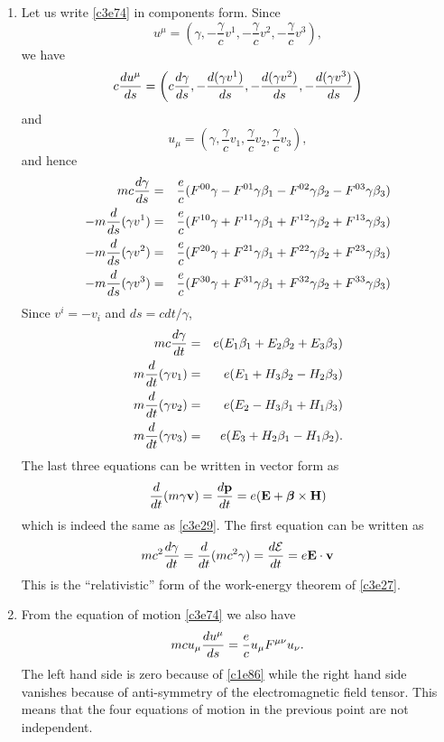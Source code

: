 \begin{enumerate}
\item Let us write \eqref{c3e74} in components form. Since
\[
u^\mu = \left(\gamma, -\frac{\gamma}{c}v^1, -\frac{\gamma}{c}v^2, -\frac{\gamma}{c}v^3\right),
\]
we have
\[
c\frac{d{u^\mu}}{d{s}} = \left(c\frac{d{\gamma}}{d{s}}, -\frac{d{(\gamma v^1)}}{d{s}}, 
-\frac{d{(\gamma v^2)}}{d{s}}, -\frac{d{(\gamma v^3)}}{d{s}}\right)
\]
and
\[
u_\mu = \left(\gamma, \frac{\gamma}{c}v_1, \frac{\gamma}{c}v_2, \frac{\gamma}{c}v_3\right),
\]
and hence
\begin{eqnarray*}
mc\frac{d{\gamma}}{d{s}} &=& \frac{e}{c}(F^{00}\gamma - F^{01}\gamma \beta_1 - F^{02}\gamma \beta_2 -F^{03}\gamma \beta_3) \\
-m\frac{d}{ds}(\gamma v^1)&=&\frac{e}{c}(F^{10}\gamma + F^{11}\gamma \beta_1 + F^{12}\gamma \beta_2 + F^{13}\gamma \beta_3) \\
-m\frac{d}{ds}(\gamma v^2)&=&\frac{e}{c}(F^{20}\gamma + F^{21}\gamma \beta_1 + F^{22}\gamma \beta_2 + F^{23}\gamma \beta_3) \\
-m\frac{d}{ds}(\gamma v^3)&=&\frac{e}{c}(F^{30}\gamma + F^{31}\gamma \beta_1 + F^{32}\gamma \beta_2 + F^{33}\gamma \beta_3) 
\end{eqnarray*}
Since $v^i = -v_i$ and $ds = cdt/\gamma$,
\begin{eqnarray*}
mc\frac{d{\gamma}}{d{t}} &=& e(E_1 \beta_1 + E_2 \beta_2 + E_3 \beta_3) \\
m\frac{d}{dt}(\gamma v_1) &=& e(E_1 + H_3 \beta_2 - H_2 \beta_3) \\
m\frac{d}{dt}(\gamma v_2) &=& e(E_2 - H_3 \beta_1 + H_1 \beta_3) \\
m\frac{d}{dt}(\gamma v_3) &=& e(E_3 + H_2 \beta_1 - H_1 \beta_2).
\end{eqnarray*}
The last three equations can be written in vector form as
\[
\frac{d}{dt}(m\gamma\mathbf{v}) = \frac{d{\mathbf{p}}}{d{t}} = e(\mathbf{E} + \bm{\beta} \times \mathbf{H})
\]
which is indeed the same as \eqref{c3e29}. The first equation can be written as
\[
mc^2\frac{d{\gamma}}{d{t}} = \frac{d}{dt}(mc^2\gamma) = \frac{d{\mathcal{E}}}{d{t}} = e\mathbf{E}\cdot\mathbf{v}
\]
This is the ``relativistic'' form of the work-energy theorem of \eqref{c3e27}.

\item From the equation of motion \eqref{c3e74} we also have
\[
mcu_\mu\frac{d{u^\mu}}{d{s}} = \frac{e}{c}u_\mu F^{\mu\nu}u_\nu.
\]
The left hand side is zero because of \eqref{c1e86} while the right hand side 
vanishes because of anti-symmetry of the electromagnetic field tensor. This means
that the four equations of motion in the previous point are not independent.


\end{enumerate}
